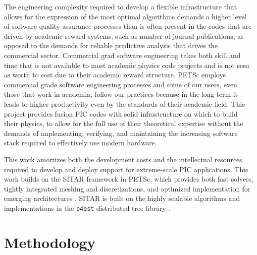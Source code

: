 \documentclass[review]{siamart}
\begin{document}
The engineering complexity required to develop a flexible infrastructure that allows for the expression of the most optimal algorithms demands a higher level of software quality assurance processes than is often present in the codes that are driven by academic reward systems, such as number of journal publications, as opposed to the demands for reliable predictive analysis that drives the commercial sector.
Commercial grad software engineering takes both skill and time that is not available to most academic physics code projects and is not seen as worth to cost due to their academic reward structure.
PETSc employs commercial grade software engineering processes and some of our users, even those that work in academia, follow our practices because in the long term it leads to higher productivity even by the standards of their academic field. 
This project provides fusion PIC codes with solid infrastructure on which to build their physics, to allow for the full use of their theoretical expertise without the demands of implementing, verifying, and maintaining the increasing software stack required to effectively use modern hardware.

This work amortizes both the development costs and the intellectual resources required to develop and deploy support for extreme-scale PIC applications.
This work builds on the SITAR framework in PETSc, which provides both fast solvers, tightly integrated meshing and discretizations, and optimized implementation for emerging architectures \cite{KnepleyBrownMcInnesSmithRuppAdams2015}.
SITAR is built on the highly scalable algorithms and implementations in the {\tt p4est} distributed tree library \cite{DBLP:journals/siamsc/IsaacBWG15,Rudi:2015:EIS:2807591.2807675,Stadler1033}.

\section{Methodology}
\end{document}
